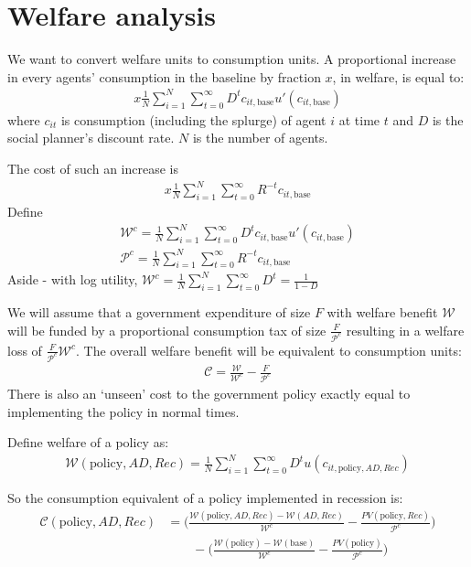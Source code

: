 \documentclass[11pt]{article}
\begin{document}
	\FloatBarrier
	\section{Welfare analysis}
	
	We want to convert welfare units to consumption units. A proportional increase in every agents' consumption in the baseline by fraction $x$, in welfare, is equal to:
	\begin{align}
	x\frac{1}{N}\sum_{i=1}^{N} \sum_{t=0}^{\infty} D^t c_{it,\text{base}} u'(c_{it,\text{base}})
	\end{align}
	where $c_{it}$ is consumption (including the splurge) of agent $i$ at time $t$ and $D$ is the social planner's discount rate. $N$ is the number of agents.
	
	
	The cost of such an increase is
	\begin{align}
	x\frac{1}{N}\sum_{i=1}^{N} \sum_{t=0}^{\infty} R^{-t} c_{it,\text{base}}
	\end{align}
	Define
	\begin{align}
	\mathcal{W}^c =\frac{1}{N}\sum_{i=1}^{N} \sum_{t=0}^{\infty} D^t c_{it,\text{base}} u'(c_{it,\text{base}}) \\
	\mathcal{P}^c = \frac{1}{N}\sum_{i=1}^{N} \sum_{t=0}^{\infty} R^{-t} c_{it,\text{base}}
	\end{align}
	Aside - with log utility, $\mathcal{W}^c =\frac{1}{N}\sum_{i=1}^{N} \sum_{t=0}^{\infty} D^t = \frac{1}{1-D}$
	
	We will assume that a government expenditure of size $F$ with welfare benefit $\mathcal{W}$ will be funded by a proportional consumption tax of size $\frac{F}{\mathcal{P}^c}$ resulting in a welfare loss of $\frac{F}{\mathcal{P}^c}\mathcal{W}^c$. The overall welfare benefit will be equivalent to consumption units:
	\begin{align}
	\mathcal{C} = \frac{\mathcal{W}}{\mathcal{W}^c} - \frac{F}{\mathcal{P}^c}
	\end{align}
	There is also an `unseen' cost to the government policy exactly equal to implementing the policy in normal times.
	
	Define welfare of a policy as:
	\begin{align}
	\mathcal{W}(\text{policy},AD,Rec) = \frac{1}{N}\sum_{i=1}^{N} \sum_{t=0}^{\infty} D^t u(c_{it,\text{policy},AD,Rec})
	\end{align}
	
	So the consumption equivalent of a policy implemented in recession is:
	\begin{align}
	\mathcal{C}(\text{policy},AD,Rec) &= \bigg(\frac{\mathcal{W}(\text{policy},AD,Rec)-\mathcal{W}(AD,Rec)}{\mathcal{W}^c} - \frac{PV(\text{policy},Rec)}{\mathcal{P}^c} \bigg)\\ \nonumber
	& \qquad -
	\bigg(\frac{\mathcal{W}(\text{policy}) - \mathcal{W}(\text{base})}{\mathcal{W}^c} - \frac{PV(\text{policy})}{\mathcal{P}^c} \bigg)
	\end{align}
	
\end{document}
